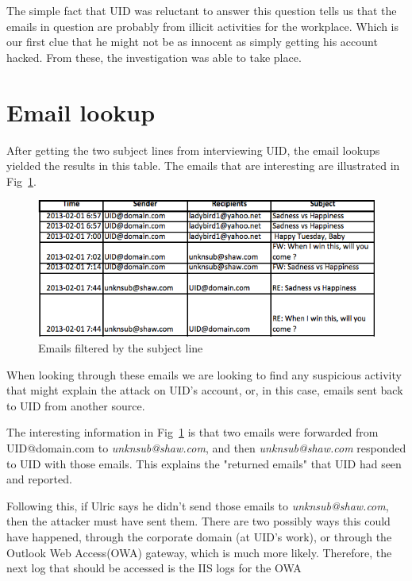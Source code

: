 \documentclass{article}
\numberwithin{equation}{section} %
\numberwithin{figure}{section} %
\numberwithin{table}{section} %
\begin{document}
The simple fact that UID was reluctant to answer this question tells us that the emails in question are probably from illicit activities for the workplace.  Which is our first clue that he might not be as innocent as simply getting his account hacked.  From these, the investigation was able to take place.

\section{Email lookup}
After getting the two subject lines from interviewing UID, the email lookups yielded the results in this table.\cite{emails}  The emails that are interesting are illustrated in Fig~\ref{fig:emails}.

\begin{figure}[h!]
	\label{fig:emails}
	\centering
	\includegraphics[width=\textwidth]{emails}
	\caption{Emails filtered by the subject line}	
\end{figure}

When looking through these emails we are looking to find any suspicious activity that might explain the attack on UID's account, or, in this case, emails sent back to UID from another source. 

The interesting information in Fig~\ref{fig:emails} is that two emails were forwarded from UID@domain.com to \textit{unknsub@shaw.com}, and then \textit{unknsub@shaw.com} responded to UID with those emails.  This explains the "returned emails" that UID had seen and reported.  

Following this, if Ulric says he didn't send those emails to \textit{unknsub@shaw.com}, then the attacker must have sent them.  There are two possibly ways this could have happened, through the corporate domain (at UID's work), or through the Outlook Web Access(OWA) gateway, which is much more likely.  Therefore, the next log that should be accessed is the IIS logs for the OWA

 

\end{document}
